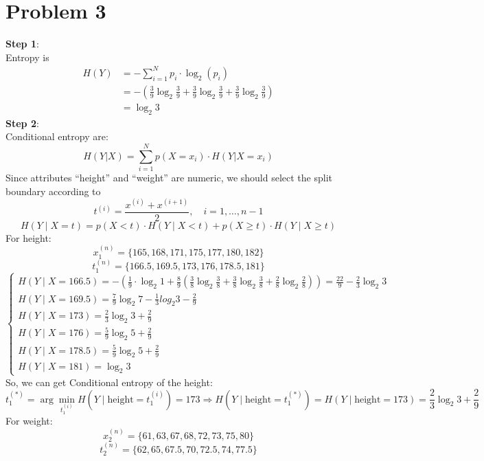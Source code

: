 \documentclass[onecolumn,oneside]{SUSTechHomework}
\begin{document}
    \section{Problem 3}
    \textbf{Step 1}: \\
    Entropy is
    \[
        \begin{split}
            H(Y) &= -\sum_{i=1}^N p_i\cdot \log_2(p_i) \\
            & = -(\frac{3}{9} \log_2 \frac{3}{9} + \frac{3}{9} \log_2 \frac{3}{9} + \frac{3}{9} \log_2 \frac{3}{9}) \\
            & = \log_2 3
        \end{split}
    \]
    \textbf{Step 2}:\\
    Conditional entropy are: 
    \[
        H(Y|X) = \sum_{i=1}^N p(X = x_i) \cdot H(Y|X = x_i)
    \]
    Since attributes “height” and “weight” are numeric, we should select the split boundary according to
    \[
        t^{(i)} = \frac{x^{(i)} + x^{(i+1)}}{2}, \quad i = 1, \dots, n-1
    \]
    \[
        H(Y \mid X=t) = p(X < t) \cdot H(Y \mid X < t) + p(X \geq t) \cdot H(Y \mid X \geq t)
    \]
    For height: 
    \[
        x_1^{(n)} = \{165, 168, 171, 175, 177, 180, 182\}
    \]
    \[
        t_1^{(n)} = \{166.5, 169.5, 173, 176, 178.5, 181\}
    \]
    \[
        \begin{cases}
            H(Y \mid X=166.5) = -\left(\frac{1}{9}\cdot \log_2 1 + \frac{8}{9}\left(\frac{3}{8} \log_2 \frac{3}{8} + \frac{3}{8} \log_2 \frac{3}{8} + \frac{2}{8} \log_2 \frac{2}{8}\right)\right)=\frac{22}{9} - \frac{2}{3} \log_2 3 \\
            H(Y \mid X=169.5) = \frac{7}{9}\log_2 7 - \frac{1}{3}log_2 3 - \frac{2}{9} \\
            H(Y \mid X=173) = \frac{2}{3}\log_2 3 + \frac{2}{9} \\
            H(Y \mid X=176) = \frac{5}{9}\log_2 5 + \frac{2}{9} \\
            H(Y \mid X=178.5) = \frac{5}{9}\log_2 5 + \frac{2}{9} \\
            H(Y \mid X = 181) = \log_2 3
        \end{cases}
    \]
    So, we can get Conditional entropy of the height:
    \[
    t_1^{(*)} = \arg\min_{t_1^{(i)}} H(Y \mid \text{height} = t_1^{(i)}) = 173 \Rightarrow H(Y \mid \text{height} = t_1^{(*)}) = H(Y \mid \text{height} = 173) = \frac{2}{3} \log_2 3 + \frac{2}{9}
    \]
    For weight:
    \[
        x_2^{(n)} = \{61, 63, 67, 68, 72, 73, 75, 80\}
    \]
    \[
        t_2^{(n)} = \{62, 65, 67.5, 70, 72.5, 74, 77.5\}
    \]
\end{document}
